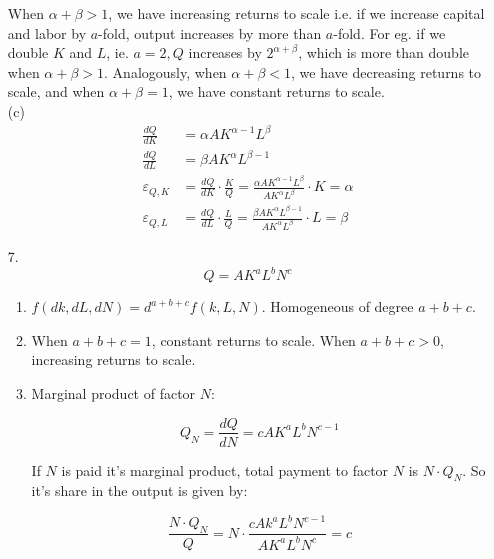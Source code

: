 \documentclass{./../../Latex/homework}
\begin{document}
\begin{enumerate}
When $\alpha+\beta>1$, we have increasing returns to scale i.e. if we increase capital and labor by $a$-fold, output increases by more than $a$-fold. For eg. if we double $K$ and $L$, ie. $a=2, Q$ increases by $2^{\alpha+\beta}$, which is more than double when $\alpha+\beta>1$. Analogously, when $\alpha+\beta<1$, we have decreasing returns to scale, and when 
$\alpha+\beta=1$, we have constant returns to scale. \\

(c)
$$
 \begin{aligned}
\frac{d Q}{d K} &=\alpha A K^{\alpha-1} L^{\beta} \\
\frac{d Q}{d L} &=\beta A K^{\alpha} L^{\beta-1} \\
\varepsilon_{Q, K} &=\frac{d Q}{d K} \cdot \frac{K}{Q}=\frac{\alpha A K^{\alpha-1} L^ \beta}{A K^{\alpha} L^ \beta} \cdot K = \alpha\\
\varepsilon_{Q, L} &=\frac{d Q}{d L} \cdot \frac{L}{Q}=\frac{\beta A K^{\alpha} L^{\beta-1}}{A K^{\alpha} L^{\beta}} \cdot L =\beta
\end{aligned}
$$

\vspace{1em}

\item[7.]  $$Q=A K^{a} L^{b} N^{c}$$

\begin{enumerate}

\item $f(d k, d L, d N)=d^{a+b+c} f(k, L, N)$. Homogeneous of degree $a+b+c$. 

\item  When $a+b+c=1$, constant returns to scale. When $a+b+c>0$, increasing returns to scale. 

\item  Marginal product of factor $N$:

$$Q_{N} =\frac{d Q}{d N}=c A K^{a} L^{b} N^{c-1} $$

If $N$ is paid it's marginal product, total payment to factor $N$ is $N \cdot Q_{N}$. So it's share in the output is given by:

$$ \frac{N \cdot Q_{N}}{Q} =N \cdot \frac{c A k^{a} L^{b} N^{c-1}}{A K^{a} L^{b} N^{c}}=c
$$
\end{enumerate}
\end{enumerate}
\end{document}
